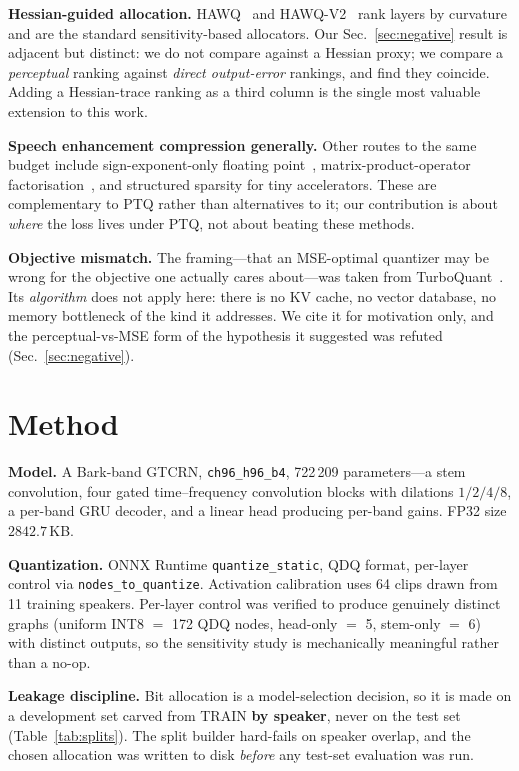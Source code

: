 \documentclass[conference]{IEEEtran}
\begin{document}
\textbf{Hessian-guided allocation.} HAWQ~\cite{dong2019} and HAWQ-V2~\cite{dong2020} rank layers by
curvature and are the standard sensitivity-based allocators. Our Sec.~\ref{sec:negative} result is
adjacent but distinct: we do not compare against a Hessian proxy; we compare a \emph{perceptual}
ranking against \emph{direct output-error} rankings, and find they coincide. Adding a Hessian-trace
ranking as a third column is the single most valuable extension to this work.

\textbf{Speech enhancement compression generally.} Other routes to the same budget include
sign-exponent-only floating point~\cite{hsieh2021}, matrix-product-operator
factorisation~\cite{sun2020}, and structured sparsity for tiny accelerators. These are
complementary to PTQ rather than alternatives to it; our contribution is about \emph{where} the
loss lives under PTQ, not about beating these methods.

\textbf{Objective mismatch.} The framing---that an MSE-optimal quantizer may be wrong for the
objective one actually cares about---was taken from TurboQuant~\cite{zandieh2025}. Its
\emph{algorithm} does not apply here: there is no KV cache, no vector database, no memory
bottleneck of the kind it addresses. We cite it for motivation only, and the perceptual-vs-MSE form
of the hypothesis it suggested was refuted (Sec.~\ref{sec:negative}).

\section{Method}

\textbf{Model.} A Bark-band GTCRN, \texttt{ch96\_h96\_b4}, 722\,209 parameters---a stem
convolution, four gated time--frequency convolution blocks with dilations $1/2/4/8$, a per-band GRU
decoder, and a linear head producing per-band gains. FP32 size $2842.7$\,KB.

\textbf{Quantization.} ONNX Runtime \texttt{quantize\_static}, QDQ format, per-layer control via
\texttt{nodes\_to\_quantize}. Activation calibration uses 64 clips drawn from 11 training speakers.
Per-layer control was verified to produce genuinely distinct graphs (uniform INT8 $=$ 172 QDQ
nodes, head-only $=$ 5, stem-only $=$ 6) with distinct outputs, so the sensitivity study is
mechanically meaningful rather than a no-op.

\textbf{Leakage discipline.} Bit allocation is a model-selection decision, so it is made on a
development set carved from TRAIN \textbf{by speaker}, never on the test set
(Table~\ref{tab:splits}). The split builder hard-fails on speaker overlap, and the chosen
allocation was written to disk \emph{before} any test-set evaluation was run.
\end{document}
